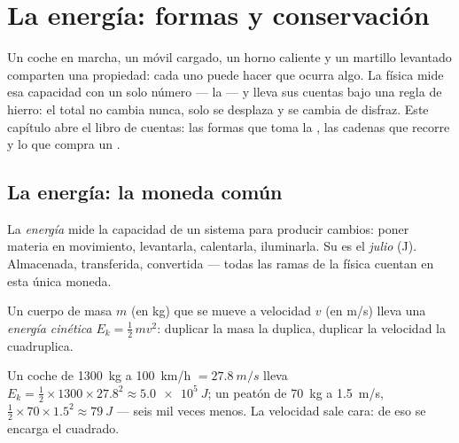 \chapter{La energía: formas y conservación}\label{ch:g10:energy-conservation}

Un coche en marcha, un móvil cargado, un horno caliente y un martillo
levantado comparten una propiedad: cada uno puede hacer que ocurra algo.
La física mide esa capacidad con un solo número --- la  --- y
lleva sus cuentas bajo una regla de hierro: el total no cambia nunca,
solo se desplaza y se cambia de disfraz. Este capítulo abre el libro de
cuentas: las formas que toma la , las cadenas que recorre y lo
que compra un .

\section{La energía: la moneda común}

\begin{definition}\label{def:g10:energy-conservation:energy}
La \emph{energía} mide la capacidad de un sistema para
producir cambios: poner materia en movimiento, levantarla, calentarla,
iluminarla. Su  es el \emph{julio} (\unit{J}).
Almacenada, transferida, convertida --- todas las ramas de la física
cuentan en esta única moneda.
\end{definition}

\begin{definition}\label{def:g10:energy-conservation:kinetic}
Un cuerpo de masa $m$ (en \unit{kg}) que se mueve a velocidad $v$ (en
\unit{m/s}) lleva una \emph{energía cinética}
$E_k = \tfrac12\, m v^2$: duplicar la masa la duplica, duplicar la
velocidad la cuadruplica.
\end{definition}

\begin{example}\label{ex:g10:energy-conservation:kinetic}
Un coche de \qty{1300}{kg} a \qty{100}{km/h} $= \qty{27.8}{m/s}$ lleva
$E_k = \tfrac12 \times 1300 \times 27.8^2 \approx \qty{5.0e5}{J}$; un
peatón de \qty{70}{kg} a \qty{1.5}{m/s},
$\tfrac12 \times 70 \times 1.5^2 \approx \qty{79}{J}$ --- seis mil veces
menos. La velocidad sale cara: de eso se encarga el cuadrado.
\end{example}

